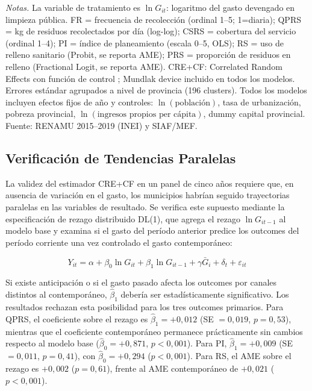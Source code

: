 \begin{table}[htbp]
\begin{threeparttable}
\begin{tablenotes}
\small
\textit{Notas.} La variable de tratamiento es $\ln G_{it}$: logaritmo del gasto devengado en limpieza pública.
FR = frecuencia de recolección (ordinal 1--5; 1=diaria); QPRS = kg de residuos recolectados por día (log-log);
CSRS = cobertura del servicio (ordinal 1--4); PI = índice de planeamiento (escala 0--5, OLS);
RS = uso de relleno sanitario (Probit, se reporta AME); PRS = proporción de residuos en relleno (Fractional Logit, se reporta AME).
CRE+CF: Correlated Random Effects con función de control \citep{Wooldridge2015}; Mundlak device incluido en todos los modelos.
Errores estándar agrupados a nivel de provincia (196 clusters).
Todos los modelos incluyen efectos fijos de año y controles: $\ln(\text{población})$, tasa de urbanización, pobreza provincial, $\ln(\text{ingresos propios per cápita})$, dummy capital provincial.
Fuente: RENAMU 2015--2019 (INEI) y SIAF/MEF.
\end{tablenotes}
\end{threeparttable}
\end{table}

\subsection{Verificación de Tendencias Paralelas}
\label{sec:pretendencias}

La validez del estimador CRE+CF en un panel de cinco años requiere que, en ausencia de variación en el gasto, los municipios habrían seguido trayectorias paralelas en las variables de resultado.
Se verifica este supuesto mediante la especificación de rezago distribuido DL(1), que agrega el rezago $\ln G_{it-1}$ al modelo base y examina si el gasto del período anterior predice los outcomes del período corriente una vez controlado el gasto contemporáneo:

\begin{equation}
  Y_{it} = \alpha + \beta_0 \ln G_{it} + \beta_1 \ln G_{it-1} + \gamma \bar{G}_{i} + \delta_{t} + \varepsilon_{it}
  \label{eq:dl1}
\end{equation}

Si existe anticipación o si el gasto pasado afecta los outcomes por canales distintos al contemporáneo, $\hat{\beta}_1$ debería ser estadísticamente significativo.
Los resultados rechazan esta posibilidad para los tres outcomes primarios.
Para QPRS, el coeficiente sobre el rezago es $\hat{\beta}_1 = +0{,}012$ (SE $= 0{,}019$, $p = 0{,}53$), mientras que el coeficiente contemporáneo permanece prácticamente sin cambios respecto al modelo base ($\hat{\beta}_0 = +0{,}871$, $p < 0{,}001$).
Para PI, $\hat{\beta}_1 = +0{,}009$ (SE $= 0{,}011$, $p = 0{,}41$), con $\hat{\beta}_0 = +0{,}294$ ($p < 0{,}001$).
Para RS, el AME sobre el rezago es $+0{,}002$ ($p = 0{,}61$), frente al AME contemporáneo de $+0{,}021$ ($p < 0{,}001$).

